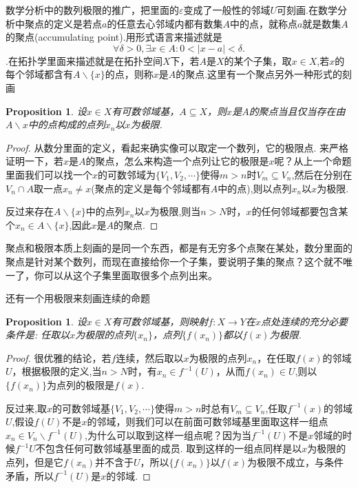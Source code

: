 \documentclass{article}
\newtheorem{proposition}[theorem]{Proposition}
\newcommand*{\xfunc}[4]{{#2}\colon{#3}{#1}{#4}}
\newcommand*{\func}[3]{\xfunc{\to}{#1}{#2}{#3}}
\begin{document}
数学分析中的数列极限的推广，把里面的$\varepsilon$变成了一般性的邻域$U$可刻画.在数学分析中聚点的定义是若点$a$的任意去心邻域内都有数集$A$中的点，就称点$a$就是数集$A$的聚点(accumulating point).用形式语言来描述就是\[\forall \delta > 0,\exists x \in A \colon 0 < |x-a| < \delta.\].在拓扑学里面来描述就是在拓扑空间$X$下，若$A$是$X$的某个子集，取$x \in X$,若$x$的每个邻域都含有$A \smallsetminus \{x\}$的点，则称$x$是$A$的聚点.这里有一个聚点另外一种形式的刻画

\begin{proposition}
设$x \in X$有可数邻域基，$A \subseteq X$，则$x$是$A$的聚点当且仅当存在由$A \smallsetminus {x}$中的点构成的点列${x_n}$以$x$为极限.
\end{proposition}

\begin{proof}
从数分里面的定义，看起来确实像可以取定一个数列，它的极限点. 来严格证明一下，若$x$是$A$的聚点，怎么来构造一个点列让它的极限是$x$呢？从上一个命题里面我们可以找一个$x$的可数邻域为$\{V_1,V_2,\cdots\}$使得$m > n$时$V_m \subseteq V_n$,然后在分别在$V_n \cap A$取一点$x_n \neq x$(聚点的定义是每个邻域都有$A$中的点),则以点列${x_n}$以$x$为极限.

反过来存在$A \smallsetminus \{x\}$中的点列${x_n}$以$x$为极限,则当$n >N$时，$x$的任何邻域都要包含某个$x_n \in A \smallsetminus \{x\}$,因此$x$是$A$的聚点.
\end{proof}

聚点和极限本质上刻画的是同一个东西，都是有无穷多个点聚在某处，数分里面的聚点是针对某个数列，而现在直接给你一个子集，要说明子集的聚点？这个就不唯一了，你可以从这个子集里面取很多个点列出来。



还有一个用极限来刻画连续的命题

\begin{proposition}
设$x \in X$有可数邻域基，则映射$\func{f}{X}{Y}$在$x$点处连续的充分必要条件是: 任取以$x$为极限的点列$\{x_n\}$，点列$\{f(x_n)\}$都以$f(x)$为极限.
\end{proposition}

\begin{proof}
很优雅的结论，若$f$连续，然后取以$x$为极限的点列$x_n$，在任取$f(x)$的邻域$U$，根据极限的定义,当$n > N$时，有$x_n \in f^{-1}(U)$，从而$f(x_n) \in U$,则以$\{f(x_n)\}$为点列的极限是$f(x)$.

反过来,取$x$的可数邻域基$\{V_1,V_2,\cdots\}$使得$m > n$时总有$V_m \subseteq V_n$,任取$f^{-1}(x)$的邻域$U$,假设$f(U)$不是$x$的邻域，则我们可以在前面可数邻域基里面取这样一组点$x_n \in V_n \smallsetminus f^{-1}(U)$,为什么可以取到这样一组点呢？因为当$f^{-1}(U)$不是$x$邻域的时候$f^{-1}{U}$不包含任何可数邻域基里面的成员. 取到这样的一组点同样是以$x$为极限的点列，但是它$f(x_n)$并不含于$U$，所以$\{f(x_n)\}$以$f(x)$为极限不成立，与条件矛盾，所以$f^{-1}(U)$是$x$的邻域.
\end{proof}
\end{document}
